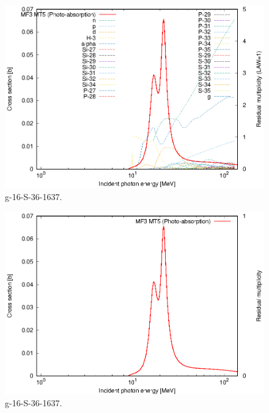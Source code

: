 \begin{figure}
 \includegraphics[width=\linewidth]{eps/g_16-S-36_1637.eps}
  \caption{g-16-S-36-1637.}
\end{figure}
\begin{figure}
 \includegraphics[width=\linewidth]{eps-law0/g_16-S-36_1637.eps}
 \caption{g-16-S-36-1637.}
\end{figure}
\newpage \clearpage

